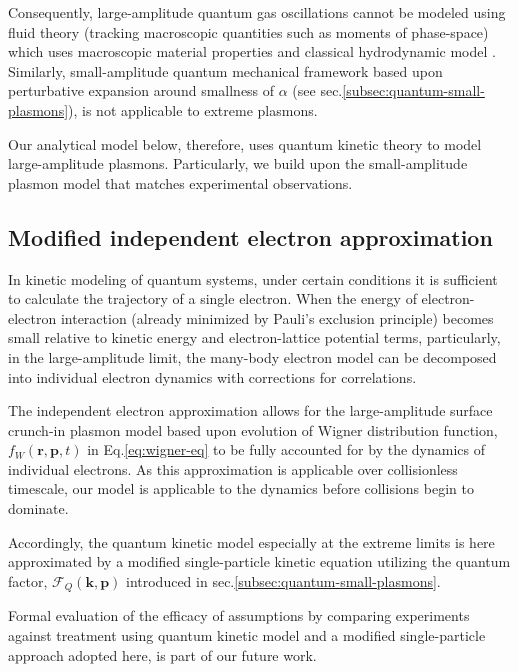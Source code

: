 \documentclass[aps,twocolumn,notitlepage,superscriptaddress]{revtex4-1}
\renewcommand\vec{\mathbf}
\begin{document}
Consequently, large-amplitude quantum gas oscillations cannot be modeled using fluid theory (tracking macroscopic quantities such as moments of phase-space) which uses macroscopic material properties and classical hydrodynamic model \cite{Kronig-Korringa-1943}. Similarly, small-amplitude quantum mechanical framework \cite{Pines-Bohm-PhysRev-1952} based upon perturbative expansion around smallness of $\alpha$ (see sec.\ref{subsec:quantum-small-plasmons}), is not applicable to extreme plasmons.

Our analytical model below, therefore, uses quantum kinetic theory to model large-amplitude plasmons. Particularly, we build upon the small-amplitude plasmon model \cite{Pines-Bohm-PhysRev-1952} that matches experimental observations.

\subsection{Modified independent electron approximation}
\label{quantum-kinetic-approx}
In kinetic modeling of quantum systems, under certain conditions it is sufficient to calculate the trajectory of a single electron. When the energy of electron-electron interaction (already minimized by Pauli's exclusion principle) becomes small relative to kinetic energy and electron-lattice potential terms, particularly, in the large-amplitude limit, the many-body electron model can be decomposed into individual electron dynamics with corrections for correlations.

The independent electron approximation allows for the large-amplitude surface crunch-in plasmon model based upon evolution of Wigner distribution function, $f_W(\vec{r},\vec{p},t)$ in Eq.\ref{eq:wigner-eq} to be fully accounted for by the dynamics of individual electrons. As this approximation is applicable over collisionless timescale, our model is applicable to the dynamics before collisions begin to dominate.

Accordingly, the quantum kinetic model especially at the extreme limits is here approximated by a modified single-particle kinetic equation utilizing the quantum factor, $\mathscr{F}_Q(\vec{k},\vec{p})$ introduced in sec.\ref{subsec:quantum-small-plasmons}.

Formal evaluation of the efficacy of assumptions by comparing experiments against treatment using quantum kinetic model and a modified single-particle approach adopted here, is part of our future work.
\end{document}
